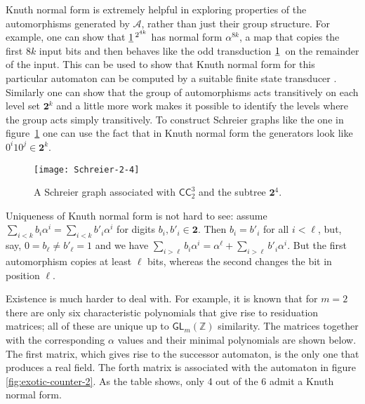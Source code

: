 \documentclass[12pt]{svmult}
\def\2{\mathbf{2}}
\def\CCC#1#2{\mathsf{CC}^{#1}_{#2}}
\def\F#1{\underline{\smash{#1}}\,}       %
\def\cA{\mathcal{A}}
\def\Z{\mathbb{Z}}
\def\GL#1{\mathsf{GL}_{#1}(\Z)}
\begin{document}
Knuth normal form is extremely helpful in exploring properties of the automorphisms 
generated by $\cA$, rather than just their group structure. 
For example, one can show that $\F{1}^{2^{4k}}$ has normal form $\alpha^{8k}$, a 
map that copies the first $8k$ input bits and then behaves like the odd transduction 
$\F{1}$ on the remainder of the input. 
This can be used to show that Knuth normal form for this particular automaton can be 
computed by a suitable finite state transducer \cite{Sutner13:invertible_coordinates}. 
Similarly one can show that the group of automorphisms acts transitively on each level 
set $\2^{k}$ and  a little more work makes it possible to identify the levels where 
the group acts simply transitively. 
To construct Schreier graphs like the one in figure~\ref{fig:Schreier} one can use the
fact that in Knuth normal form the generators look like  $0^{i}10^{j} \in \2^{k}$.

\begin{figure}[t]
  \centering
  \texttt{[image: Schreier-2-4]}
  \caption{A Schreier graph associated with $\CCC{3}{2}$ and the subtree $\2^4$.}
  \label{fig:Schreier}
\end{figure}

Uniqueness of Knuth normal form is not hard to see: assume 
$\sum_{i<k} b_{i} \alpha^{i} = \sum_{i<k} b'_{i} \alpha^{i}$ for digits $b_{i}, b'_{i} \in \2$. 
Then $b_{i} = b'_{i}$ for all $i < \ell$, but, say, $0 = b_{\ell} \neq b'_{\ell} = 1$ 
and we have $\sum_{i>\ell} b_{i} \alpha^{i} = \alpha^{\ell} + \sum_{i>\ell} b'_{i} \alpha^{i}$. 
But the first automorphism copies at least $\ell$ bits, whereas the second changes the 
bit in position $\ell$. 

Existence is much harder to deal with. 
For example, it is known that for $m = 2$ there are only six characteristic polynomials that
give rise to residuation matrices; all of these are unique up to $\GL{m}$ similarity. 
The matrices together with the corresponding $\alpha$ values and their minimal 
polynomials are shown below. 
The first matrix, which gives rise to the successor automaton, is the only one that 
produces a real field. 
The forth matrix is associated with the automaton in figure \ref{fig:exotic-counter-2}.
As the table shows, only 4 out of the 6 admit a Knuth normal form. 
\end{document}
